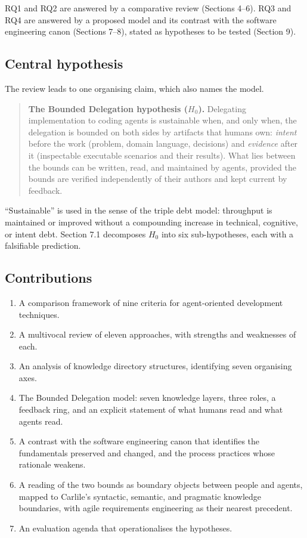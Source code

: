 \documentclass[11pt]{article}
\begin{document}
RQ1 and RQ2 are answered by a comparative review (Sections 4--6). RQ3 and RQ4 are answered by a proposed model and its contrast with the software engineering canon (Sections 7--8), stated as hypotheses to be tested (Section 9).

\subsection{Central hypothesis}

The review leads to one organising claim, which also names the model.

\begin{quote}
\textbf{The Bounded Delegation hypothesis ($H_0$).} Delegating implementation to coding agents is sustainable when, and only when, the delegation is bounded on both sides by artifacts that humans own: \emph{intent} before the work (problem, domain language, decisions) and \emph{evidence} after it (inspectable executable scenarios and their results). What lies between the bounds can be written, read, and maintained by agents, provided the bounds are verified independently of their authors and kept current by feedback.
\end{quote}

``Sustainable'' is used in the sense of the triple debt model: throughput is maintained or improved without a compounding increase in technical, cognitive, or intent debt. Section 7.1 decomposes $H_0$ into six sub-hypotheses, each with a falsifiable prediction.

\subsection{Contributions}

\begin{enumerate}[leftmargin=*]
  \item A comparison framework of nine criteria for agent-oriented development techniques.
  \item A multivocal review of eleven approaches, with strengths and weaknesses of each.
  \item An analysis of knowledge directory structures, identifying seven organising axes.
  \item The Bounded Delegation model: seven knowledge layers, three roles, a feedback ring, and an explicit statement of what humans read and what agents read.
  \item A contrast with the software engineering canon that identifies the fundamentals preserved and changed, and the process practices whose rationale weakens.
  \item A reading of the two bounds as boundary objects between people and agents, mapped to Carlile's syntactic, semantic, and pragmatic knowledge boundaries, with agile requirements engineering as their nearest precedent.
  \item An evaluation agenda that operationalises the hypotheses.
\end{enumerate}
\end{document}
